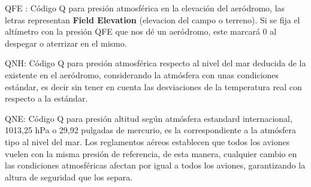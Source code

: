 QFE : C\'odigo Q para presi\'on atmosf\'erica en la elevaci\'on del aer\'odromo, las letras representan \textbf{Field Elevation} (elevacion del campo o terreno). 
Si se fija el altímetro con la presión QFE que nos dé un aeródromo, este marcará 0 al despegar o aterrizar en el mismo.

QNH: C\'odigo Q para presi\'on atmosf\'erica respecto al nivel del mar deducida de la existente en el aeródromo, considerando la atmósfera con unas condiciones estándar, es decir sin tener en cuenta las desviaciones de la temperatura real con respecto a la estándar. 

QNE: C\'odigo Q para presi\'on altitud seg\'un atm\'osfera estandard internacional, 1013,25 hPa o 29,92 pulgadas de mercurio,  es la correspondiente a la atmósfera tipo al nivel del mar.  
Los reglamentos aéreos establecen que todos los aviones vuelen con la misma presión de referencia, de esta manera, cualquier cambio en las condiciones atmosféricas afectan por igual a todos los aviones, garantizando la altura de seguridad que los separa.
